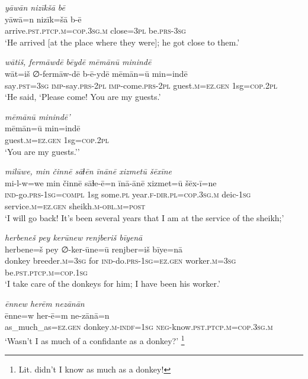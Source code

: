 \ea \label{HB.50}
\textit{yāwān nizīkšā bē} \\ 
\gll yāwā=n nizīk=šā b-ē \\ 
 arrive\textsc{.pst}\textsc{.ptcp}\textsc{.m}\textsc{=cop}\textsc{.3sg}\textsc{.m} close\textsc{=3pl} be\textsc{.prs}\textsc{-3sg} \\ 
\glt `He arrived [at the place where they were]; he got close to them.'
\z 
 
\ea \label{HB.51}
\textit{wātiš, fermāwdē bēydē mēmānū minindē} \\ 
\gll wāt=iš ∅-fermāw-dē b-ē-ydē mēmān=ū min=indē \\ 
 say\textsc{.pst}\textsc{=3sg} \textsc{imp-}say\textsc{.prs}\textsc{-2pl} \textsc{imp-}come\textsc{.prs}\textsc{-2pl} guest\textsc{.m}\textsc{=ez}\textsc{.gen} 1sg\textsc{=cop}\textsc{.2pl} \\ 
\glt `He said, ‘Please come! You are my guests.'
\z 
 
\ea \label{HB.52}
\textit{mēmānū minindē'} \\ 
\gll mēmān=ū min=indē \\ 
 guest\textsc{.m}\textsc{=ez}\textsc{.gen} 1sg\textsc{=cop}\textsc{.2pl} \\ 
\glt `You are my guests.’'
\z 
 
\ea \label{HB.68}
\textit{milūwe, min činnē sāɫēn īnānē xizmetū šēxīne} \\ 
\gll mi-l-w=we min činnē sāɫe-ē=n īnā-ānē xizmet=ū šēx-ī=ne \\ 
 \textsc{ind-}go\textsc{.prs}\textsc{-1sg}\textsc{=\textsc{compl}} 1sg some\textsc{.pl} year\textsc{\textsc{.f}}\textsc{-dir}\textsc{.pl}\textsc{=cop}\textsc{.3sg}\textsc{.m} deic\textsc{-1sg} service\textsc{.m}\textsc{=ez}\textsc{.gen} sheikh\textsc{.m}\textsc{-obl}\textsc{.m}\textsc{=\textsc{post}} \\ 
\glt `I will go back! It’s been several years that I am at the service of the sheikh;'
\z 
 
\ea \label{HB.69}
\textit{herbeneš pey kerūnew renjberiš bīyenā} \\ 
\gll herbene=š pey ∅-ker-ūne=ū renjber=iš bīye=nā \\ 
 donkey breeder\textsc{.m}\textsc{=3sg} for \textsc{ind-}do\textsc{.prs}\textsc{-1sg}\textsc{=ez}\textsc{.gen} worker\textsc{.m}\textsc{=3sg} be\textsc{.pst}\textsc{.ptcp}\textsc{.m}\textsc{=cop}\textsc{.1sg} \\ 
\glt `I take care of the donkeys for him; I have been his worker.'
\z 
 
\ea \label{HB.70}
\textit{ēnnew herēm nezānān} \\ 
\gll ēnne=w her-ē=m ne-zānā=n \\ 
 as\_much\_as\textsc{=ez}\textsc{.gen} donkey\textsc{.m}\textsc{-indf}\textsc{=1sg} \textsc{neg-}know\textsc{.pst}\textsc{.ptcp}\textsc{.m}\textsc{=cop}\textsc{.3sg}\textsc{.m} \\ 
\glt `Wasn’t I as much of a confidante as a donkey?' \footnote{Lit. didn’t I know as much as a donkey!}
\z 
 
